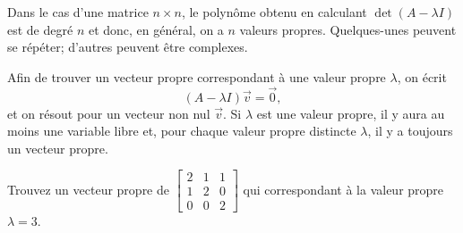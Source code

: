 Dans le cas d’une matrice $n \times n$, le polynôme obtenu en calculant $\det(A - \lambda I)$ est de degré $n$ et donc, en général, on a $n$ valeurs propres. Quelques-unes peuvent se répéter; d’autres peuvent être complexes.

\medskip

Afin de trouver un vecteur propre correspondant à une valeur propre $\lambda$, on écrit
\begin{equation*}
(A-\lambda I) \vec{v} = \vec{0} ,
\end{equation*}
et on résout pour un vecteur non nul $\vec{v}$.
Si $\lambda$ est une valeur propre, il y aura au moins une variable libre et, pour chaque valeur propre distincte $\lambda$, il y a toujours un vecteur propre.

\begin{example}
Trouvez un vecteur propre de
$\left[ \begin{smallmatrix}
2 & 1 & 1 \\
1 & 2 & 0 \\
0 & 0 & 2
\end{smallmatrix} \right]$ qui correspondant à la valeur propre $\lambda = 3$.


\end{example}
